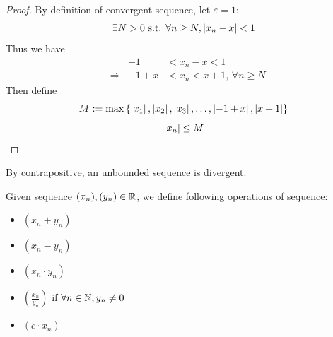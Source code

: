 \documentclass[a4paper,12pt]{article}
\begin{document}
\begin{theorem}
    \begin{proof}
        By definition of convergent sequence, let \(\varepsilon=1\):
        \[\exists N>0\text{ s.t. }\forall n\ge N, \left\lvert x_n-x\right\rvert<1\]
        Thus we have
        \begin{align*}
            &&-1&<x_n-x<1\\
            &\Rightarrow& -1+x&<x_n<x+1, \,\forall n\ge N
        \end{align*}
        Then define 
        \[M:=\max{\{\left\lvert x_1\right\rvert,\left\lvert x_2\right\rvert,\left\lvert x_3\right\rvert,\dots,\left\lvert -1+x\right\rvert,\left\lvert x+1\right\rvert\}}\]
        \[\left\lvert x_n\right\rvert\le M\]
    \end{proof}

    \begin{remark}
        By contrapositive, an unbounded sequence is divergent.\\
    \end{remark}
\end{theorem}

\begin{definition}
    Given sequence \((x_{n}), (y_{n})\in\mathbb{R}\),
    we define following operations of sequence:
    \begin{itemize}
        \item {} \((x_n+y_n)\)
        \item {} \((x_n-y_n)\)
        \item {} \((x_n\cdot y_n)\)
        \item {} \((\frac{x_n}{y_n})\) if \(\forall n\in\mathbb{N}, y_n\neq 0\)
        \item {} \((c\cdot x_n)\)\\
    \end{itemize}
\end{definition}
\end{document}
